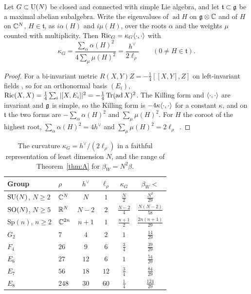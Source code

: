 \begin{lemma}\label{lem:ricci}
Let $G\subset\mathrm{U}(N)$ be closed and connected with simple Lie algebra, and let
$\mathfrak t\subset\mathfrak{g}$ be a maximal abelian subalgebra. Write the eigenvalues
of $\operatorname{ad}H$ on $\mathfrak{g}\otimes\mathbb{C}$ and of $H$ on $\mathbb{C}^N$, $H\in\mathfrak t$, as
$i\alpha(H)$ and $i\mu(H)$, over the roots $\alpha$ and the weights $\mu$ counted
with multiplicity. Then $\operatorname{Ric}_G=\kappa_G\langle \cdot,\cdot\rangle$ with
\[
\kappa_G=\frac{\sum_\alpha\alpha(H)^2}{4\sum_\mu\mu(H)^2}=\frac{h^\vee}{2\ell_\rho}
\qquad(0\ne H\in\mathfrak t).
\]
\end{lemma}

\begin{proof}
For a bi-invariant metric $R(X,Y)Z=-\frac14[[X,Y],Z]$ on left-invariant fields
\cite[Sect.~7]{Mil76}, so for an orthonormal basis $(E_i)$,
$\operatorname{Ric}(X,X)=\frac14\sum_i|[X,E_i]|^2=-\frac14\operatorname{Tr}(\operatorname{ad}X)^2$. The
Killing form and $\langle \cdot,\cdot\rangle$ are invariant and $\mathfrak{g}$ is simple, so the
Killing form is $-4\kappa\langle \cdot,\cdot\rangle$ for a constant $\kappa$, and on
$\mathfrak t$ the two forms are $-\sum_\alpha\alpha(H)^2$ and $\sum_\mu\mu(H)^2$.
For $H$ the coroot of the highest root, $\sum_\alpha\alpha(H)^2=4h^\vee$ and
$\sum_\mu\mu(H)^2=2\ell_\rho$~\cite[Ch.~6]{Kac90}.
\end{proof}

\begin{table}[t]
\caption{The curvature $\kappa_G=h^\vee/(2\ell_\rho)$ in a faithful
representation of least dimension $N$, and the range of Theorem~\ref{thm:A}
for $\beta_W=N^2\beta$.}
\label{tab:groups}
\begin{tabular}{llcccc}
\toprule
Group&$\rho$&$h^\vee$&$\ell_\rho$&$\kappa_G$&$\beta_W<$\\
\midrule
$\mathrm{SU}(N)$, $N\ge2$&$\mathbb{C}^N$&$N$&$1$&$\frac N2$&$\frac{N^2}{29}$\\
$\mathrm{SO}(N)$, $N\ge5$&$\mathbb{R}^N$&$N-2$&$2$&$\frac{N-2}4$&$\frac{N(N-2)}{58}$\\
$\mathrm{Sp}(n)$, $n\ge2$&$\mathbb{C}^{2n}$&$n+1$&$1$&$\frac{n+1}2$&$\frac{2n(n+1)}{29}$\\
$G_2$&$7$&$4$&$2$&$1$&$\frac{14}{29}$\\
$F_4$&$26$&$9$&$6$&$\frac34$&$\frac{39}{29}$\\
$E_6$&$27$&$12$&$6$&$1$&$\frac{54}{29}$\\
$E_7$&$56$&$18$&$12$&$\frac34$&$\frac{84}{29}$\\
$E_8$&$248$&$30$&$60$&$\frac14$&$\frac{124}{29}$\\
\bottomrule
\end{tabular}
\end{table}

